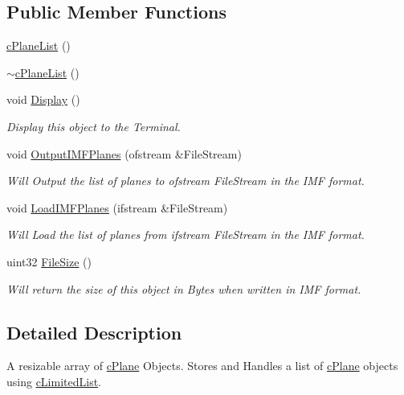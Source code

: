 \subsection*{Public Member Functions}
\begin{DoxyCompactItemize}
\item 
\hyperlink{classc_plane_list_a1fc903c730312ac882ed67388e4501a8}{cPlaneList} ()
\item 
\hyperlink{classc_plane_list_a527c8da158d36f6378bbbd5380f66ae0}{$\sim$cPlaneList} ()
\item 
void \hyperlink{classc_plane_list_aa59eb08cabf77a8556a968164078548a}{Display} ()
\begin{DoxyCompactList}\small\item\em Display this object to the Terminal. \item\end{DoxyCompactList}\item 
void \hyperlink{classc_plane_list_a4ab2d73d6d19172d102ae6b567838f40}{OutputIMFPlanes} (ofstream \&FileStream)
\begin{DoxyCompactList}\small\item\em Will Output the list of planes to ofstream FileStream in the IMF format. \item\end{DoxyCompactList}\item 
void \hyperlink{classc_plane_list_aaef4989b858a7f403b23acc209bb70d9}{LoadIMFPlanes} (ifstream \&FileStream)
\begin{DoxyCompactList}\small\item\em Will Load the list of planes from ifstream FileStream in the IMF format. \item\end{DoxyCompactList}\item 
uint32 \hyperlink{classc_plane_list_a7789059ebbee4e08469ee870ca63b56c}{FileSize} ()
\begin{DoxyCompactList}\small\item\em Will return the size of this object in Bytes when written in IMF format. \item\end{DoxyCompactList}\end{DoxyCompactItemize}


\subsection{Detailed Description}
A resizable array of \hyperlink{classc_plane}{cPlane} Objects. Stores and Handles a list of \hyperlink{classc_plane}{cPlane} objects using \hyperlink{classc_limited_list}{cLimitedList}. 


